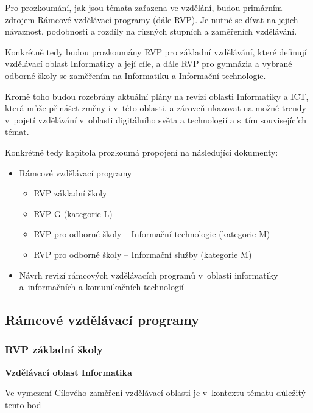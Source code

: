 Pro prozkoumání, jak jsou témata zařazena ve vzdělání, budou primárním zdrojem Rámcové vzdělávací programy (dále RVP). Je nutné se dívat na jejich návaznost, podobnosti a rozdíly na různých stupních a zaměřeních vzdělávání.

Konkrétně tedy budou prozkoumány RVP pro základní vzdělávání, které definují vzdělávací oblast Informatiky a její cíle, a dále RVP pro gymnázia a vybrané odborné školy se zaměřením na Informatiku a Informační technologie. 

Kromě toho budou rozebrány aktuální plány na revizi oblasti Informatiky a ICT, která může přinášet změny i v~této oblasti, a zároveň ukazovat na možné trendy v~pojetí vzdělávání v~oblasti digitálního světa a technologií a s~tím souvisejících témat.

Konkrétně tedy kapitola prozkoumá propojení na následující dokumenty:

\begin{itemize}
\item Rámcové vzdělávací programy
	\begin{itemize}
    \item RVP základní školy \citep{rvp-zs}
    \item RVP-G (kategorie L) \citep{rvp-g}
    \item RVP pro odborné školy -- Informační technologie \citep{rvp-it} (kategorie M)
    \item RVP pro odborné školy -- Informační služby\citep{rvp-is} (kategorie M)
	\end{itemize}
\item Návrh revizí rámcových vzdělávacích programů v oblasti informatiky a informačních a komunikačních technologií \citep{revize}
\end{itemize}

\subsection{Rámcové vzdělávací programy}

\subsubsection*{RVP základní školy}

\textbf{Vzdělávací oblast Informatika}

Ve vymezení Cílového zaměření vzdělávací oblasti je v~kontextu tématu důležitý tento bod

\begin{displayquote}
	\citep{rvp-zs}
\end{displayquote}

